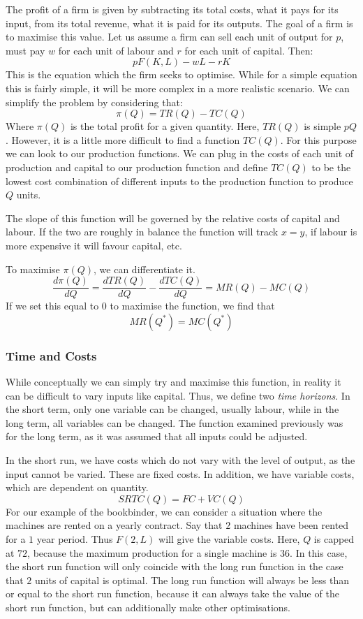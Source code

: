\documentclass[12pt]{report}
\begin{document}
\bigskip
The profit of a firm is given by subtracting its total costs, what it pays for
its input, from its total revenue, what it is paid for its outputs. The goal of
a firm is to maximise this value. Let us assume a firm can sell each unit of 
output for \(p\), must pay \(w\) for each unit of labour and \(r\) for each 
unit of capital. Then:
\[pF(K, L) - wL - rK\]
This is the equation which the firm seeks to optimise. While for a simple 
equation this is fairly simple, it will be more complex in a more realistic
scenario. We can simplify the problem by considering that:
\[\pi(Q) = TR(Q) - TC(Q)\]
Where \(\pi(Q)\) is the total profit for a given quantity. Here, \(TR(Q)\) is
simple \(pQ\). However, it is a little more difficult to find a function 
\(TC(Q)\). For this purpose we can look to our production functions. We can
plug in the costs of each unit of production and capital to our production 
function and define \(TC(Q)\) to be the lowest cost combination of different
inputs to the production function to produce \(Q\) units. 

\bigskip
The slope of this function will be governed by the relative costs of capital
and labour. If the two are roughly in balance the function will track 
\(x = y\), if labour is more expensive it will favour capital, etc.

\bigskip
To maximise \(\pi(Q)\), we can differentiate it.
\[\frac{d\pi(Q)}{dQ} = \frac{dTR(Q)}{dQ} - \frac{dTC(Q)}{dQ} = MR(Q) - MC(Q)\]
If we set this equal to 0 to maximise the function, we find that
\[MR(Q^*) = MC(Q^*)\]

\subsubsection*{Time and Costs}
While conceptually we can simply try and maximise this function, in reality it
can be difficult to vary inputs like capital. Thus, we define two \textit{time 
horizons}. In the short term, only one variable can be changed, usually labour,
while in the long term, all variables can be changed. The function examined
previously was for the long term, as it was assumed that all inputs could be
adjusted.

\bigskip
In the short run, we have costs which do not vary with the level of output, as
the input cannot be varied. These are fixed costs. In addition, we have 
variable costs, which are dependent on quantity.
\[SRTC(Q) = FC + VC(Q)\]
For our example of the bookbinder, we can consider a situation where the 
machines are rented on a yearly contract. Say that \(2\) machines have been 
rented for a \(1\) year period. Thus \(F(2, L)\) will give the variable costs.
Here, \(Q\) is capped at \(72\), because the maximum production for a single
machine is \(36\). In this case, the short run function will only coincide
with the long run function in the case that \(2\) units of capital is optimal.
The long run function will always be less than or equal to the short run 
function, because it can always take the value of the short run function, but
can additionally make other optimisations.
\end{document}
